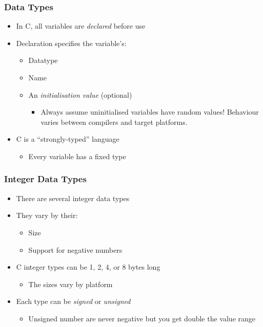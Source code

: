 \documentclass[14pt]{beamer}
\begin{document}
\begin{frame}
\frametitle{Data Types}
\begin{itemize}
\item In C, all variables are \textit{declared} before use
\item Declaration specifies the variable's:
	\begin{itemize}
		\item Datatype
		\item Name
		\item An \textit{initialisation value} (optional)
			\begin{itemize}
				\item Always assume uninitialised variables have random values! Behaviour varies between compilers and target platforms.
			\end{itemize}
	\end{itemize}
\item C is a ``strongly-typed'' language
	\begin{itemize}
		\item Every variable has a fixed type
	\end{itemize}
\end{itemize}
\end{frame}

\begin{frame}
\frametitle{Integer Data Types}
\begin{itemize}
\item There are several integer data types
\item They vary by their:
	\begin{itemize}
		\item Size
		\item Support for negative numbers
	\end{itemize}
\item C integer types can be 1, 2, 4, or 8 bytes long
	\begin{itemize}
		\item The sizes vary by platform
	\end{itemize}
\item Each type can be \textit{signed} or \textit{unsigned}
	\begin{itemize}
		\item Unsigned number are never negative but you get double the value range
	\end{itemize}
\end{itemize}
\end{frame}
\end{document}
